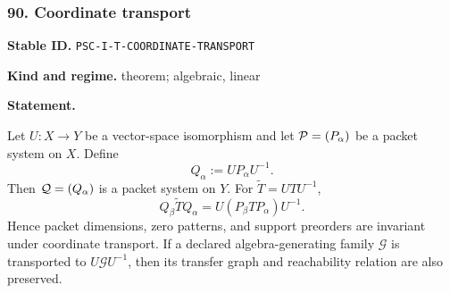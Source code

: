 \documentclass[a4paper,11pt]{article}
\newcommand{\field}[2]{\noindent\textbf{#1.} #2\par}
\begin{document}
\subsubsection*{90. Coordinate transport}
\label{rec:PSC-I-T-COORDINATE-TRANSPORT}
\field{Stable ID}{\nolinkurl{PSC-I-T-COORDINATE-TRANSPORT}}
\field{Kind and regime}{theorem; algebraic, linear}
\textbf{Statement.}\par
Let $U:X\to Y$ be a vector-space isomorphism and let $\mathcal P=(P_\alpha)$ be a packet system on $X$.  Define
\[
Q_\alpha:=UP_\alpha U^{-1}.
\]
Then $\mathcal Q=(Q_\alpha)$ is a packet system on $Y$.  For $\widetilde T=UTU^{-1}$,
\[
\boxed{
Q_\beta\widetilde TQ_\alpha
=
U(P_\beta TP_\alpha)U^{-1}.
}
\]
Hence packet dimensions, zero patterns, and support preorders are invariant under coordinate transport.  If a declared algebra-generating family $\mathcal G$ is transported to $U\mathcal G U^{-1}$, then its transfer graph and reachability relation are also preserved.
\end{document}
